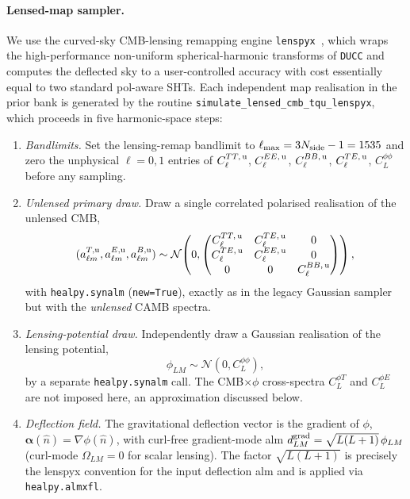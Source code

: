 \documentclass[11pt]{article}
\theoremstyle{definition}
\begin{document}
\paragraph{Lensed-map sampler.}
We use the curved-sky CMB-lensing remapping engine \texttt{lenspyx}~\cite{reinecke2023ducc}, which wraps the high-performance non-uniform spherical-harmonic transforms of \texttt{DUCC} and computes the deflected sky to a user-controlled accuracy with cost essentially equal to two standard pol-aware SHTs. Each independent map realisation in the prior bank is generated by the routine \texttt{simulate\_lensed\_cmb\_tqu\_lenspyx}, which proceeds in five harmonic-space steps:
\begin{enumerate}[leftmargin=2.0em,itemsep=0.1em]
  \item \emph{Bandlimits.} Set the lensing-remap bandlimit to $\ell_{\max}=3N_{\rm side}-1=1535$ and zero the unphysical $\ell=0,1$ entries of $C_\ell^{TT,\,\rm u}$, $C_\ell^{EE,\,\rm u}$, $C_\ell^{BB,\,\rm u}$, $C_\ell^{TE,\,\rm u}$, $C_L^{\phi\phi}$ before any sampling.
  \item \emph{Unlensed primary draw.} Draw a single correlated polarised realisation of the unlensed CMB,
  \begin{equation}
    (a^{T,\rm u}_{\ell m},a^{E,\rm u}_{\ell m},a^{B,\rm u}_{\ell m})
    \sim
    \mathcal N\!\left(0,
    \begin{pmatrix}C_\ell^{TT,\,\rm u} & C_\ell^{TE,\,\rm u} & 0\\
                   C_\ell^{TE,\,\rm u} & C_\ell^{EE,\,\rm u} & 0\\
                   0 & 0 & C_\ell^{BB,\,\rm u}\end{pmatrix}\right),
  \end{equation}
  with \texttt{healpy.synalm} (\texttt{new=True}), exactly as in the legacy Gaussian sampler but with the \emph{unlensed} CAMB spectra.
  \item \emph{Lensing-potential draw.} Independently draw a Gaussian realisation of the lensing potential,
  \begin{equation}
    \phi_{LM}\sim\mathcal N(0,C_L^{\phi\phi}),
  \end{equation}
  by a separate \texttt{healpy.synalm} call. The CMB$\times\phi$ cross-spectra $C_L^{\phi T}$ and $C_L^{\phi E}$ are not imposed here, an approximation discussed below.
  \item \emph{Deflection field.} The gravitational deflection vector is the gradient of $\phi$, $\bm\alpha(\hat n)=\nabla\phi(\hat n)$, with curl-free gradient-mode alm $d_{LM}^{\rm grad}=\sqrt{L(L+1)}\,\phi_{LM}$ (curl-mode $\Omega_{LM}=0$ for scalar lensing). The factor $\sqrt{L(L+1)}$ is precisely the lenspyx convention for the input deflection alm and is applied via \texttt{healpy.almxfl}.

\end{enumerate}
\end{document}
